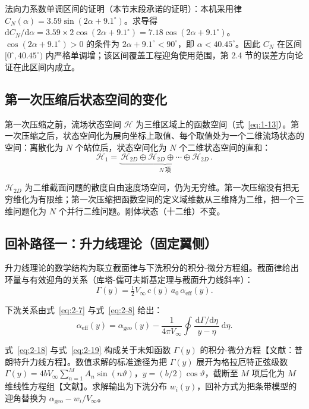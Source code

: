 \documentclass[11pt,a4paper]{ctexart}
\numberwithin{equation}{section}
\begin{document}
法向力系数单调区间的证明（本节末段承诺的证明）：本机采用律 { $C_N(\alpha) = 3.59\sin(2\alpha + 9.1^\circ)$}。求导得 $\mathrm{d}C_N/\mathrm{d}\alpha = 3.59 \times 2\cos(2\alpha + 9.1^\circ) = 7.18\cos(2\alpha + 9.1^\circ)$。$\cos(2\alpha + 9.1^\circ) > 0$ 的条件为 $2\alpha + 9.1^\circ < 90^\circ$，即 $\alpha < 40.45^\circ$。因此 $C_N$ 在区间 $[0^\circ, 40.45^\circ)$ 内严格单调增；该区间覆盖工程迎角使用范围，第 2.4 节的误差方向论证在此区间内成立。

\subsection{第一次压缩后状态空间的变化}

第一次压缩之前，流场状态空间 $\mathcal{H}$ 为三维区域上的函数空间（式~\eqref{eq:1-13}）。第一次压缩之后，状态空间化为展向坐标上取值、每个取值处为一个二维流场状态的空间：离散化为 $N$ 个站位后，状态空间化为 $N$ 个二维状态空间的直和：
\begin{equation}
  \mathcal{H}_1 = \underbrace{\,\mathcal{H}_{2D} \oplus \mathcal{H}_{2D} \oplus \cdots \oplus \mathcal{H}_{2D}\,}_{N\ \text{项}}. \label{eq:2-17}
\end{equation}

$\mathcal{H}_{2D}$ 为二维截面问题的散度自由速度场空间，仍为无穷维。第一次压缩没有把无穷维化为有限维；第一次压缩把函数空间的定义域维数从三维降为二维，把一个三维问题化为 $N$ 个并行二维问题。刚体状态（十二维）不变。

\subsection{回补路径一：升力线理论（固定翼侧）}

升力线理论的数学结构为联立截面律与下洗积分的积分-微分方程组。截面律给出环量与有效迎角的关系（库塔-儒可夫斯基定理与截面升力线斜率）：
\begin{equation}
  \Gamma(y) = \tfrac{1}{2} V_\infty\, c(y)\, a_0\, \alpha_{\text{eff}}(y). \label{eq:2-18}
\end{equation}

下洗关系由式~\eqref{eq:2-7} 与式~\eqref{eq:2-8} 给出：
\begin{equation}
  \alpha_{\text{eff}}(y) = \alpha_{\text{geo}}(y) - \frac{1}{4\pi V_\infty}\oint \frac{\,\mathrm{d}\Gamma/\mathrm{d}\eta\,}{y - \eta}\,\mathrm{d}\eta. \label{eq:2-19}
\end{equation}

式~\eqref{eq:2-18} 与式~\eqref{eq:2-19} 构成关于未知函数 $\Gamma(y)$ 的积分-微分方程【文献：普朗特升力线方程】。数值求解的标准途径为把 $\Gamma(y)$ 展开为格拉厄特正弦级数 $\Gamma(y) = 4bV_\infty \sum_{n=1}^{M} A_n\sin(n\vartheta)$，$y = (b/2)\cos\vartheta$，截断至 $M$ 项后化为 $M$ 维线性方程组【文献】。求解输出为下洗分布 $w_i(y)$，回补方式为把条带模型的迎角替换为 $\alpha_{\text{geo}} - w_i/V_\infty$。
\end{document}
